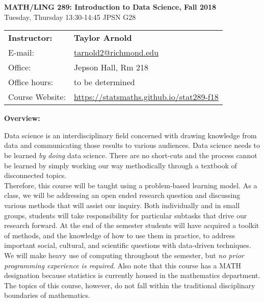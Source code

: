 \documentclass[12pt]{article}
\begin{document}
\begin{center}
{\bf MATH/LING 289: Introduction to Data Science, Fall 2018} \\
Tuesday, Thursday 13:30-14:45 \quad JPSN G28\\
\end{center}

\bigskip

\noindent
\begin{tabular}{ l l }
{\bf Instructor:} &  {\bf Taylor Arnold} \\
E-mail: & \href{mailto:tarnold2@richmond.edu}{tarnold2@richmond.edu} \\
Office: & Jepson Hall, Rm 218 \\
Office hours: & to be determined \\
Course Website: & \url{https://statsmaths.github.io/stat289-f18}
\end{tabular}

\vspace{0.5cm}

\textbf{Overview:} \vspace{6pt}

Data science is an interdisciplinary field concerned with drawing knowledge
from data and communicating those results to various audiences. Data
science needs to be learned \textit{by doing} data science. There are
no short-cuts and the process cannot be learned by simply working our way
methodically through a textbook of disconnected topics.\\

Therefore, this course will be taught using a problem-based learning model. As
a class, we will be addressing an open ended research question and discussing
various methods that will assist our inquiry. Both individually and in small
groups, students will take responsibility for particular subtasks that drive
our research forward. At the end of the semester students will have acquired
a toolkit of methods, and the knowledge of how to use them in practice, to
address important social, cultural, and scientific questions with data-driven
techniques.\\

We will make heavy use of computing throughout the semester, but \textit{no
prior programming experience is required}. Also note that this course has a
MATH designation because statistics is currently housed in the mathematics
department. The topics of this course, however, do not fall within the
traditional disciplinary boundaries of mathematics.\\
\end{document}
